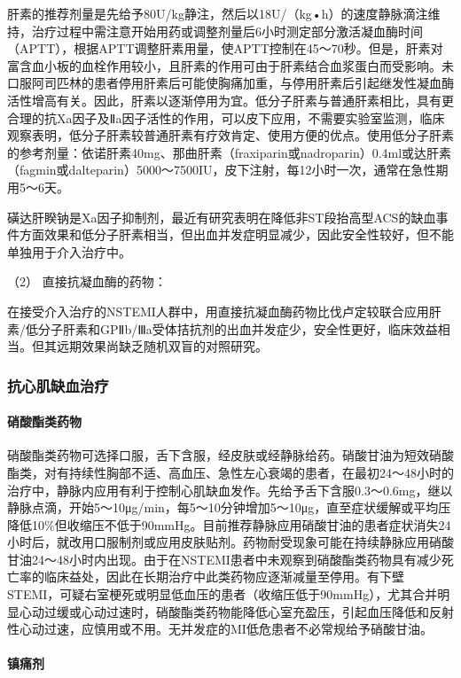 肝素的推荐剂量是先给予80U/kg静注，然后以18U/（kg•h）的速度静脉滴注维持，治疗过程中需注意开始用药或调整剂量后6小时测定部分激活凝血酶时间（APTT），根据APTT调整肝素用量，使APTT控制在45～70秒。但是，肝素对富含血小板的血栓作用较小，且肝素的作用可由于肝素结合血浆蛋白而受影响。未口服阿司匹林的患者停用肝素后可能使胸痛加重，与停用肝素后引起继发性凝血酶活性增高有关。因此，肝素以逐渐停用为宜。低分子肝素与普通肝素相比，具有更合理的抗Xa因子及Ⅱa因子活性的作用，可以皮下应用，不需要实验室监测，临床观察表明，低分子肝素较普通肝素有疗效肯定、使用方便的优点。使用低分子肝素的参考剂量：依诺肝素40mg、那曲肝素（fraxiparin或nadroparin）0.4ml或达肝素（fagmin或dalteparin）5000～7500IU，皮下注射，每12小时一次，通常在急性期用5～6天。

磺达肝睽钠是Xa因子抑制剂，最近有研究表明在降低非ST段抬高型ACS的缺血事件方面效果和低分子肝素相当，但出血并发症明显减少，因此安全性较好，但不能单独用于介入治疗中。

\hypertarget{text00312.htmlux5cux23CHP10-8-2-3-2-2-2}{}
（2） 直接抗凝血酶的药物：

在接受介入治疗的NSTEMI人群中，用直接抗凝血酶药物比伐卢定较联合应用肝素/低分子肝素和GPⅡb/Ⅲa受体拮抗剂的出血并发症少，安全性更好，临床效益相当。但其远期效果尚缺乏随机双盲的对照研究。

\subsubsection{抗心肌缺血治疗}

\paragraph{硝酸酯类药物}

硝酸酯类药物可选择口服，舌下含服，经皮肤或经静脉给药。硝酸甘油为短效硝酸酯类，对有持续性胸部不适、高血压、急性左心衰竭的患者，在最初24～48小时的治疗中，静脉内应用有利于控制心肌缺血发作。先给予舌下含服0.3～0.6mg，继以静脉点滴，开始5～10μg/min，每5～10分钟增加5～10μg，直至症状缓解或平均压降低10\%但收缩压不低于90mmHg。目前推荐静脉应用硝酸甘油的患者症状消失24小时后，就改用口服制剂或应用皮肤贴剂。药物耐受现象可能在持续静脉应用硝酸甘油24～48小时内出现。由于在NSTEMI患者中未观察到硝酸酯类药物具有减少死亡率的临床益处，因此在长期治疗中此类药物应逐渐减量至停用。有下壁STEMI，可疑右室梗死或明显低血压的患者（收缩压低于90mmHg），尤其合并明显心动过缓或心动过速时，硝酸酯类药物能降低心室充盈压，引起血压降低和反射性心动过速，应慎用或不用。无并发症的MI低危患者不必常规给予硝酸甘油。

\paragraph{镇痛剂}

